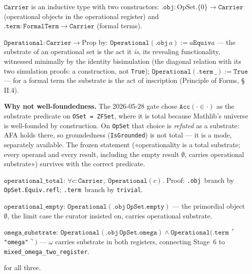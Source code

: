 \begin{definition}
\label{def:Carrier}
\leanok
{}
$\texttt{Carrier}$ is an inductive type with two constructors:
$\texttt{.obj} : \mathrm{OpSet}.\{0\} \to \texttt{Carrier}$ (operational
objects in the operational register) and
$\texttt{.term} : \texttt{FormalTerm} \to \texttt{Carrier}$ (formal terms).

$\texttt{Operational} : \texttt{Carrier} \to \mathrm{Prop}$ by:
$\texttt{Operational}(\texttt{.obj}\,a) := a \mathrel{\mathtt{Equiv}} a$
--- the substrate of an operational set is the act it \emph{is}, its
revealing functionality, witnessed minimally by the identity bisimulation
(the diagonal relation with its two simulation proofs: a construction, not
\texttt{True});
$\texttt{Operational}(\texttt{.term}\,\_) := \texttt{True}$ --- for a formal
term the substrate is the act of inscription (Principle of Forms, §\,II.4).

\textbf{Why not well-foundedness.}  The 2026-05-28 gate chose
$\texttt{Acc}({\cdot}\in{\cdot})$ as the substrate predicate on
\texttt{OSet = ZFSet}, where it is total because Mathlib's universe is
well-founded by construction.  On \texttt{OpSet} that choice is
\emph{refuted} as a substrate: AFA holds there, so groundedness
(\texttt{IsGrounded}) is not total --- it is a mode, separately available.
The frozen statement («operationality is a total substrate; every operand
and every result, including the empty result $\emptyset$, carries
operational substrate») survives with the correct predicate.
\end{definition}

\begin{theorem}
\label{thm:operational_total}
\leanok
{}
$\texttt{operational\_total}$: $\forall c : \texttt{Carrier},\;
\texttt{Operational}(c)$.  Proof: \texttt{.obj}~branch by
\texttt{OpSet.Equiv.refl}; \texttt{.term}~branch by \texttt{trivial}.

$\texttt{operational\_empty}$: $\texttt{Operational}(\texttt{.obj}\,
\texttt{OpSet.empty})$ --- the primordial object $\emptyset$, the limit case
the curator insisted on, carries operational substrate.

$\texttt{omega\_substrate}$: $\texttt{Operational}(\texttt{.obj}\,
\texttt{OpSet.omega}) \land \texttt{Operational}(\texttt{.term}\,
\ulcorner$\texttt{"omega"}$\urcorner)$ --- $\omega$ carries substrate in
both registers, connecting Stage~6 to
\texttt{mixed\_omega\_two\_register}.

\noindent\axiomprofile{[]} for all three.
\end{theorem}

